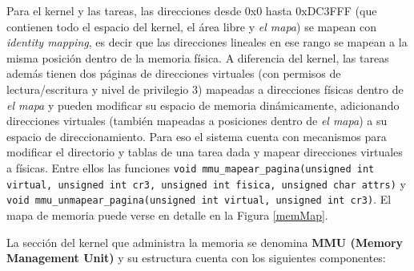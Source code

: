 \documentclass[a4paper]{article}
\begin{document}
Para el kernel y las tareas, las direcciones desde 0x0 hasta 0xDC3FFF (que contienen todo el espacio del kernel, el área libre y \textit{el mapa}) se mapean con \textit{identity mapping}, es decir que las direcciones lineales en ese rango se mapean a la misma posición dentro de la memoria física. A diferencia del kernel, las tareas además tienen dos páginas de direcciones virtuales (con permisos de lectura/escritura y nivel de privilegio 3) mapeadas a direcciones físicas dentro de \textit{el mapa} y pueden modificar su espacio de memoria dinámicamente, adicionando direcciones virtuales (también mapeadas a posiciones dentro de \textit{el mapa}) a su espacio de direccionamiento. Para eso el sistema cuenta con mecanismos para modificar el directorio y tablas de una tarea dada y mapear direcciones virtuales a físicas. Entre ellos las funciones \texttt{void mmu_mapear_pagina(unsigned int virtual, unsigned int cr3, unsigned int fisica, unsigned char attrs)} y \texttt{void mmu_unmapear_pagina(unsigned int virtual, unsigned int cr3)}. El mapa de memoria puede verse en detalle en la Figura \ref{memMap}.


La sección del kernel que administra la memoria se denomina \textbf{MMU (Memory Management Unit)} y su estructura cuenta con los siguientes componentes:
\end{document}
